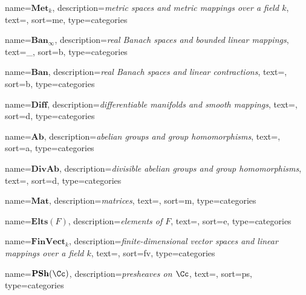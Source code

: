   {name=$\mathbf{Met}_{k}$, description=\emph{metric spaces and metric mappings over a field $k$},
  text={}, sort=me, type=categories}
  \DeclareMathOperator{\Met}{\gls{Met}}%

  {name=$\mathbf{Ban}_{\infty}$, description=\emph{real Banach spaces and bounded linear mappings},
  text={_{\infty}}, sort=b, type=categories}
  \DeclareMathOperator{\Banb}{\gls{Banb}}%

  {name=$\mathbf{Ban}$, description=\emph{real Banach spaces and linear contractions},
  text={}, sort=b, type=categories}
  \DeclareMathOperator{\Ban}{\gls{Ban}}%

  {name=$\mathbf{Diff}$, description=\emph{differentiable manifolds and smooth mappings},
  text={}, sort=d, type=categories}
  \DeclareMathOperator{\Diff}{\gls{Diff}}%

  {name=$\mathbf{Ab}$, description=\emph{abelian groups and group homomorphisms},
  text={}, sort=a, type=categories}
  \DeclareMathOperator{\Ab}{\gls{Ab}}%

  {name=$\mathbf{DivAb}$, description=\emph{divisible abelian groups and group homomorphisms},
  text={}, sort=d, type=categories}
  \DeclareMathOperator{\DivAb}{\gls{DivAb}}%

  {name=$\mathbf{Mat}$, description=\emph{matrices},
  text={}, sort=m, type=categories}
  \DeclareMathOperator{\Mat}{\gls{Mat}}%

  {name=$\mathbf{Elts}(F)$, description=\emph{elements of $F$},
  text={}, sort=e, type=categories}
  \DeclareMathOperator{\Elts}{\gls{Elts}}%

  {name=$\mathbf{FinVect}_{k}$, description=\emph{finite-dimensional vector spaces and linear mappings over a field $k$},
  text={}, sort=fv, type=categories}
  \DeclareMathOperator{\FinVect}{\gls{FinVect}}%

  {name=$\mathbf{PSh}(\Cc)$, description=\emph{presheaves on $\Cc$},
  text={}, sort=ps, type=categories}
  \DeclareMathOperator{\PSh}{\gls{PSh}}%

